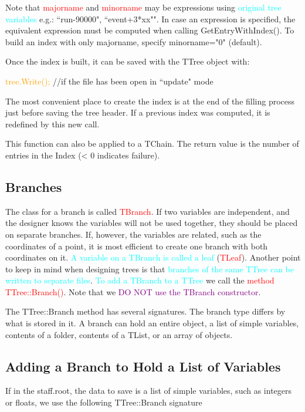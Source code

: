 \documentclass[12pt,a4paper]{article}
\begin{document}
Note that \textcolor{red}{majorname} and \textcolor{red}{minorname} may be expressions using \textcolor{cyan}{original tree variables} e.g.: ``run-90000", ``event+3*xx"". In case an expression is specified, the equivalent expression must be computed when calling GetEntryWithIndex(). To build an index with only majorname, specify minorname="0" (default). 

Once the index is built, it can be saved with the TTree object with: 

\textcolor{orange}{tree.Write();} //if the file has been open in ``update" mode

The most convenient place to create the index is at the end of the filling process just before saving the tree header. If a previous index was computed, it is redefined by this new call.

This function can also be applied to a TChain. The return value is the number of entries in the Index (< 0 indicates failure).

\subsection{Branches}
The class for a branch is called \textcolor{red}{TBranch}. If two variables are independent, and the designer knows the variables will not be used together, they should be placed on separate branches. If, however, the variables are related, such as the coordinates of a point, it is most efficient to create one branch with both coordinates on it. \textcolor{cyan}{A variable on a TBranch is called a leaf} (\textcolor{red}{TLeaf}). Another point to keep in mind when designing trees is that \textcolor{cyan}{branches of the same TTree can be written to separate files}. \textcolor{cyan}{To add a TBranch to a TTree} we call the \textcolor{red}{method TTree::Branch()}. Note that we \textcolor{purple}{DO NOT use the TBranch constructor}.

The TTree::Branch method has several signatures. The branch type differs by what is stored in it. A branch can hold an entire object, a list of simple variables, contents of a folder, contents of a TList, or an array of objects. 

\subsection{Adding a Branch to Hold a List of Variables}
If in the staff.root, the data to save is a list of simple variables, such as integers or floats, we use the following TTree::Branch signature
\end{document}
